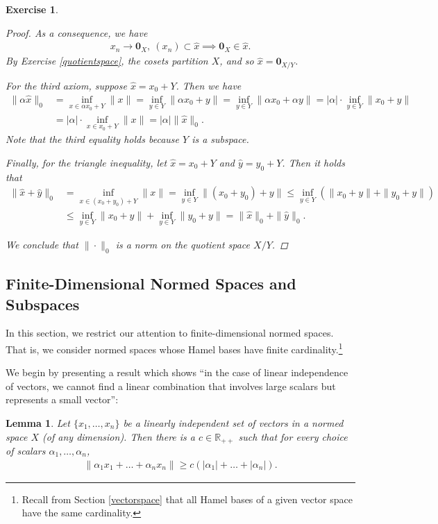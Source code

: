 \documentclass[11pt]{article}
\theoremstyle{mystyle}
\newtheorem{lm}{Lemma}[section]
\newtheorem{protoexer}{Exercise}[section]
\newenvironment{exer}
{\colorlet{shadecolor}{blue!15}\begin{shaded}\begin{protoexer}}
{\end{protoexer}\end{shaded}}
\newcommand{\0}{\mathbf{0}}
\begin{document}
\begin{exer}
\begin{proof}
As a consequence, we have 
\begin{align*}
    x_n \longrightarrow \0_X, \ (x_n) \subset \hat{x} \implies \0_X \in \hat{x}.
\end{align*}
By Exercise \ref{quotientspace}, the cosets partition $X$, and so $\hat{x} =  \0_{X/Y}$.

For the third axiom, suppose $\hat{x} = x_0 + Y$. Then we have 
\begin{align*}
    \|\alpha \hat{x}\|_0 &= \inf_{x \in \alpha x_0 + Y} \|x\| = \inf_{y \in Y} \|\alpha x_0 +  y\|  = \inf_{y \in Y} \|\alpha x_0 +  \alpha y\| = |\alpha| \cdot \inf_{y \in Y} \|x_0 +  y\|\\
    &= |\alpha| \cdot \inf_{x \in x_0 + Y} \|x\| = |\alpha| \|\hat{x}\|_0.
\end{align*}
Note that the third equality holds because $Y$ is a subspace.

Finally, for the triangle inequality, let $\hat{x} = x_0 + Y$ and $\hat{y} = y_0 + Y$. Then it holds that
\begin{align*}
    \|\hat{x} + \hat{y}\|_0 &= \inf_{x \in (x_0 + y_0)  + Y}\|x \| = \inf_{y \in Y}\|(x_0 + y_0) + y\| \leq \inf_{y \in Y}( \|x_0 + y\| + \|y_0 + y\|)\\
    &\leq \inf_{y \in Y} \|x_0 + y\| + \inf_{y \in Y} \|y_0 + y\| = \|\hat{x}\|_0 + \|\hat{y}\|_0.
\end{align*}

We conclude that $\|\cdot\|_0$ is a norm on the quotient space $X/Y$.
\end{proof}
\end{exer}

\subsection{Finite-Dimensional Normed Spaces and Subspaces}

In this section, we restrict our attention to finite-dimensional normed spaces. That is, we consider normed spaces whose Hamel bases have finite cardinality.\footnote{Recall from Section \ref{vectorspace} that all Hamel bases of a given vector space have the same cardinality.}

We begin by presenting a result which shows \enquote{in the case of linear independence of vectors, we cannot find a linear combination that involves large scalars but represents a small vector}:
\begin{lm}\label{coeff}
Let $\{x_1, \ldots, x_n\}$ be a linearly independent set of vectors in a normed space $X$ (of any dimension). Then there is a $c \in \mathbb{R}_{++}$ such that for every choice of scalars $\alpha_1, \ldots, \alpha_n$,
\begin{align*}
    \|\alpha_1 x_1 + \ldots + \alpha_n x_n\| \geq c(|\alpha_1| + \ldots + |\alpha_n|).
\end{align*}
\end{lm}
\end{document}
